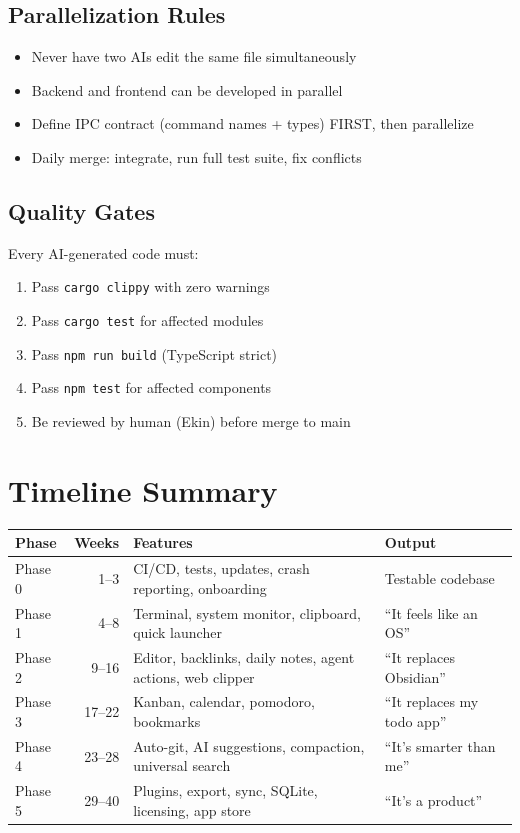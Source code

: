 \documentclass[11pt,a4paper]{article}
\begin{document}
\subsection{Parallelization Rules}

\begin{itemize}[noitemsep]
  \item Never have two AIs edit the same file simultaneously
  \item Backend and frontend can be developed in parallel
  \item Define IPC contract (command names + types) FIRST, then parallelize
  \item Daily merge: integrate, run full test suite, fix conflicts
\end{itemize}

\subsection{Quality Gates}

Every AI-generated code must:
\begin{enumerate}[noitemsep]
  \item Pass \texttt{cargo clippy} with zero warnings
  \item Pass \texttt{cargo test} for affected modules
  \item Pass \texttt{npm run build} (TypeScript strict)
  \item Pass \texttt{npm test} for affected components
  \item Be reviewed by human (Ekin) before merge to main
\end{enumerate}

\section{Timeline Summary}

\begin{table}[h]\centering\small
\begin{tabularx}{\textwidth}{XrXX}
\toprule
\textbf{Phase} & \textbf{Weeks} & \textbf{Features} & \textbf{Output} \\
\midrule
Phase 0 & 1--3 & CI/CD, tests, updates, crash reporting, onboarding & Testable codebase \\
Phase 1 & 4--8 & Terminal, system monitor, clipboard, quick launcher & ``It feels like an OS'' \\
Phase 2 & 9--16 & Editor, backlinks, daily notes, agent actions, web clipper & ``It replaces Obsidian'' \\
Phase 3 & 17--22 & Kanban, calendar, pomodoro, bookmarks & ``It replaces my todo app'' \\
Phase 4 & 23--28 & Auto-git, AI suggestions, compaction, universal search & ``It's smarter than me'' \\
Phase 5 & 29--40 & Plugins, export, sync, SQLite, licensing, app store & ``It's a product'' \\
\bottomrule
\end{tabularx}
\end{table}
\end{document}
